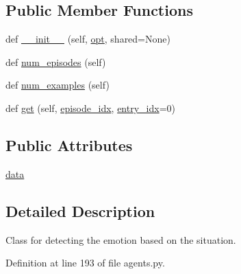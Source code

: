 \subsection*{Public Member Functions}
\begin{DoxyCompactItemize}
\item 
def \hyperlink{classparlai_1_1tasks_1_1empathetic__dialogues_1_1agents_1_1EmotionClassificationSituationTeacher_a766744d3e042178441a778fb8686b050}{\+\_\+\+\_\+init\+\_\+\+\_\+} (self, \hyperlink{classparlai_1_1tasks_1_1empathetic__dialogues_1_1agents_1_1EmpatheticDialoguesTeacher_aee4f5fe7a72beed0da64501c3b2f98d2}{opt}, shared=None)
\item 
def \hyperlink{classparlai_1_1tasks_1_1empathetic__dialogues_1_1agents_1_1EmotionClassificationSituationTeacher_aa859de9a1b37296d18b359ab1a22505c}{num\+\_\+episodes} (self)
\item 
def \hyperlink{classparlai_1_1tasks_1_1empathetic__dialogues_1_1agents_1_1EmotionClassificationSituationTeacher_aba2e962c46d7575ffa9138254d192656}{num\+\_\+examples} (self)
\item 
def \hyperlink{classparlai_1_1tasks_1_1empathetic__dialogues_1_1agents_1_1EmotionClassificationSituationTeacher_a2c790b74d62ff3c66a2937885086655b}{get} (self, \hyperlink{classparlai_1_1core_1_1teachers_1_1FixedDialogTeacher_afd4ebab8063eb42d182d30a1a41f133e}{episode\+\_\+idx}, \hyperlink{classparlai_1_1core_1_1teachers_1_1FixedDialogTeacher_ae3201b15f3c3b46a2f3511bad9b43e7d}{entry\+\_\+idx}=0)
\end{DoxyCompactItemize}
\subsection*{Public Attributes}
\begin{DoxyCompactItemize}
\item 
\hyperlink{classparlai_1_1tasks_1_1empathetic__dialogues_1_1agents_1_1EmotionClassificationSituationTeacher_a30f74a83cf905447819d471de1e686f8}{data}
\end{DoxyCompactItemize}


\subsection{Detailed Description}
\begin{DoxyVerb}Class for detecting the emotion based on the situation.
\end{DoxyVerb}
 

Definition at line 193 of file agents.\+py.



